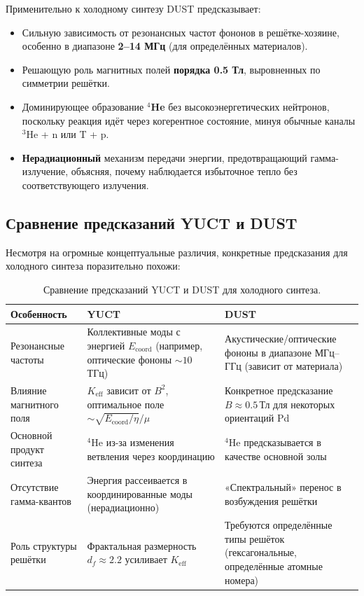 \documentclass[12pt]{article}
\theoremstyle{remark}
\newcommand{\Keff}{K_{\mathrm{eff}}}
\newcommand{\df}{d_{\!f}}
\begin{document}
	Применительно к холодному синтезу DUST предсказывает:
	\begin{itemize}
		\item Сильную зависимость от резонансных частот фононов в решётке-хозяине, особенно в диапазоне \textbf{2–14 МГц} (для определённых материалов).
		\item Решающую роль магнитных полей \textbf{порядка 0.5 Тл}, выровненных по симметрии решётки.
		\item Доминирующее образование \textbf{\(^4\)He} без высокоэнергетических нейтронов, поскольку реакция идёт через когерентное состояние, минуя обычные каналы \(^3\)He + n или T + p.
		\item \textbf{Нерадиационный} механизм передачи энергии, предотвращающий гамма-излучение, объясняя, почему наблюдается избыточное тепло без соответствующего излучения.
	\end{itemize}
	
	\subsection{Сравнение предсказаний YUCT и DUST}
	
	Несмотря на огромные концептуальные различия, конкретные предсказания для холодного синтеза поразительно похожи:
	
	\begin{table}[htbp]
		\centering
		\caption{Сравнение предсказаний YUCT и DUST для холодного синтеза.}
		\label{tab:comparison}
		\small
		\begin{tabularx}{\textwidth}{l X X}
			\toprule
			\textbf{Особенность} & \textbf{YUCT} & \textbf{DUST} \\
			\midrule
			Резонансные частоты & Коллективные моды с энергией \(E_{\mathrm{coord}}\) (например, оптические фононы \(\sim 10\) ТГц) & Акустические/оптические фононы в диапазоне МГц–ГГц (зависит от материала) \\
			Влияние магнитного поля & \(\Keff\) зависит от \(B^2\), оптимальное поле \(\sim \sqrt{E_{\mathrm{coord}}/\eta}/\mu\) & Конкретное предсказание \(B \approx 0.5\,\text{Тл}\) для некоторых ориентаций Pd \\
			Основной продукт синтеза & \(^4\)He из-за изменения ветвления через координацию & \(^4\)He предсказывается в качестве основной золы \\
			Отсутствие гамма-квантов & Энергия рассеивается в координированные моды (нерадиационно) & «Спектральный» перенос в возбуждения решётки \\
			Роль структуры решётки & Фрактальная размерность \(\df \approx 2.2\) усиливает \(\Keff\) & Требуются определённые типы решёток (гексагональные, определённые атомные номера) \\
			\bottomrule
		\end{tabularx}
	\end{table}
	
\end{document}
